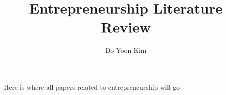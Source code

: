 \documentclass{article}
\title{Entrepreneurship Literature Review}
\author{Do Yoon Kim}
\begin{document}
\maketitle
Here is where all papers related to entrepreneurship will go
\end{document}
